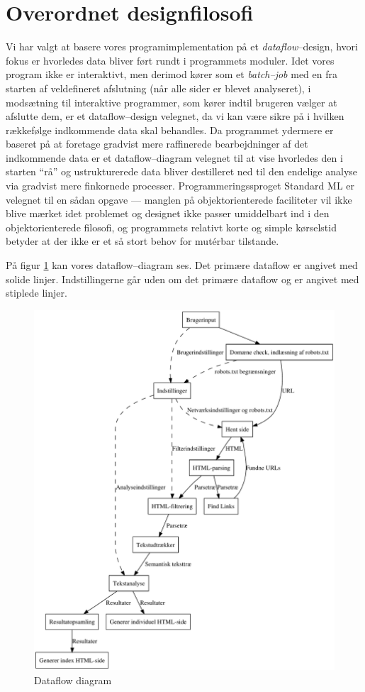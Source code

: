\documentclass[a4paper,oneside]{memoir}
\begin{document}
\section{Overordnet designfilosofi}
\label{overordnetdesign}
Vi har valgt at basere vores programimplementation på et
\textit{dataflow}--design, hvori fokus er hvorledes data bliver ført
rundt i programmets moduler. Idet vores program ikke er interaktivt,
men derimod kører som et \textit{batch--job} med en fra starten af
veldefineret afslutning (når alle sider er blevet analyseret), i
modsætning til interaktive programmer, som kører indtil brugeren
vælger at afslutte dem, er et dataflow--design velegnet, da vi kan
være sikre på i hvilken rækkefølge indkommende data skal behandles. Da
programmet ydermere er baseret på at foretage gradvist mere
raffinerede bearbejdninger af det indkommende data er et
dataflow--diagram velegnet til at vise hvorledes den i starten ``rå''
og ustrukturerede data bliver destilleret ned til den endelige analyse
via gradvist mere finkornede processer. Programmeringssproget Standard
ML er velegnet til en sådan opgave --- manglen på objektorienterede
faciliteter vil ikke blive mærket idet problemet og designet ikke
passer umiddelbart ind i den objektorienterede filosofi, og
programmets relativt korte og simple kørselstid betyder at der ikke er
et så stort behov for mutérbar tilstande. 

På figur \ref{dataflowdia} kan vores dataflow--diagram ses. Det
primære dataflow er angivet med solide linjer. Indstillingerne går
uden om det primære dataflow og er angivet med stiplede linjer.
\begin{figure}
  \includegraphics[width=\textwidth]{endeligtdesignill.pdf}
  \caption{Dataflow diagram}
  \label{dataflowdia}
\end{figure}
\end{document}
